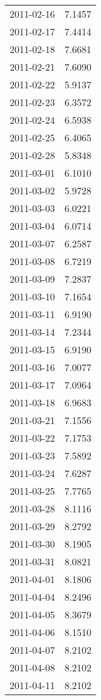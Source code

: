 \begin{tabular}{lr}
2011-02-16 &      7.1457 \\
2011-02-17 &      7.4414 \\
2011-02-18 &      7.6681 \\
2011-02-21 &      7.6090 \\
2011-02-22 &      5.9137 \\
2011-02-23 &      6.3572 \\
2011-02-24 &      6.5938 \\
2011-02-25 &      6.4065 \\
2011-02-28 &      5.8348 \\
2011-03-01 &      6.1010 \\
2011-03-02 &      5.9728 \\
2011-03-03 &      6.0221 \\
2011-03-04 &      6.0714 \\
2011-03-07 &      6.2587 \\
2011-03-08 &      6.7219 \\
2011-03-09 &      7.2837 \\
2011-03-10 &      7.1654 \\
2011-03-11 &      6.9190 \\
2011-03-14 &      7.2344 \\
2011-03-15 &      6.9190 \\
2011-03-16 &      7.0077 \\
2011-03-17 &      7.0964 \\
2011-03-18 &      6.9683 \\
2011-03-21 &      7.1556 \\
2011-03-22 &      7.1753 \\
2011-03-23 &      7.5892 \\
2011-03-24 &      7.6287 \\
2011-03-25 &      7.7765 \\
2011-03-28 &      8.1116 \\
2011-03-29 &      8.2792 \\
2011-03-30 &      8.1905 \\
2011-03-31 &      8.0821 \\
2011-04-01 &      8.1806 \\
2011-04-04 &      8.2496 \\
2011-04-05 &      8.3679 \\
2011-04-06 &      8.1510 \\
2011-04-07 &      8.2102 \\
2011-04-08 &      8.2102 \\
2011-04-11 &      8.2102 \\

\end{tabular}
